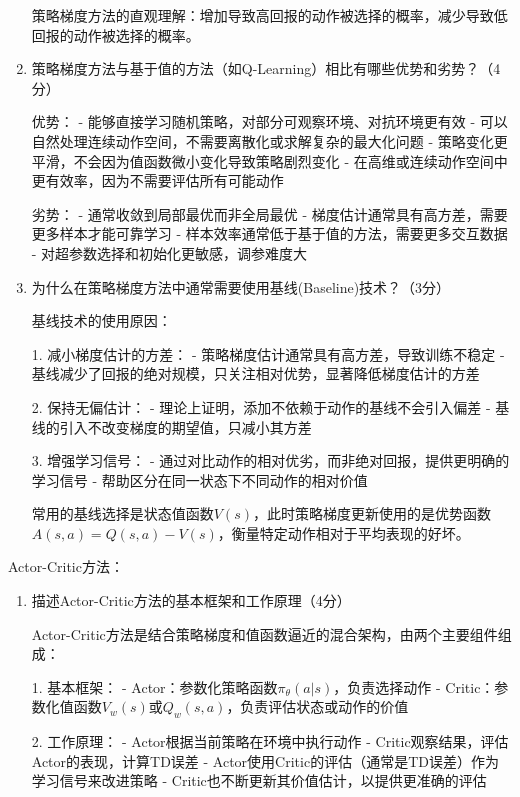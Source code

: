 \documentclass[zihao=5,answers]{BHCexam}
\begin{document}
\begin{questions}
\begin{solution}
\begin{enumerate}
    策略梯度方法的直观理解：增加导致高回报的动作被选择的概率，减少导致低回报的动作被选择的概率。
    
    \item 策略梯度方法与基于值的方法（如Q-Learning）相比有哪些优势和劣势？（4分）
    
    优势：
    - 能够直接学习随机策略，对部分可观察环境、对抗环境更有效
    - 可以自然处理连续动作空间，不需要离散化或求解复杂的最大化问题
    - 策略变化更平滑，不会因为值函数微小变化导致策略剧烈变化
    - 在高维或连续动作空间中更有效率，因为不需要评估所有可能动作
    
    劣势：
    - 通常收敛到局部最优而非全局最优
    - 梯度估计通常具有高方差，需要更多样本才能可靠学习
    - 样本效率通常低于基于值的方法，需要更多交互数据
    - 对超参数选择和初始化更敏感，调参难度大
    
    \item 为什么在策略梯度方法中通常需要使用基线(Baseline)技术？（3分）
    
    基线技术的使用原因：
    
    1. 减小梯度估计的方差：
       - 策略梯度估计通常具有高方差，导致训练不稳定
       - 基线减少了回报的绝对规模，只关注相对优势，显著降低梯度估计的方差
    
    2. 保持无偏估计：
       - 理论上证明，添加不依赖于动作的基线不会引入偏差
       - 基线的引入不改变梯度的期望值，只减小其方差
    
    3. 增强学习信号：
       - 通过对比动作的相对优劣，而非绝对回报，提供更明确的学习信号
       - 帮助区分在同一状态下不同动作的相对价值
    
    常用的基线选择是状态值函数$V(s)$，此时策略梯度更新使用的是优势函数$A(s,a) = Q(s,a) - V(s)$，衡量特定动作相对于平均表现的好坏。
\end{enumerate}
\end{solution}

\question[10] Actor-Critic方法：
\begin{solution}
\begin{enumerate}
    \item 描述Actor-Critic方法的基本框架和工作原理（4分）
    
    Actor-Critic方法是结合策略梯度和值函数逼近的混合架构，由两个主要组件组成：
    
    1. 基本框架：
       - Actor：参数化策略函数$\pi_\theta(a|s)$，负责选择动作
       - Critic：参数化值函数$V_w(s)$或$Q_w(s,a)$，负责评估状态或动作的价值
    
    2. 工作原理：
       - Actor根据当前策略在环境中执行动作
       - Critic观察结果，评估Actor的表现，计算TD误差
       - Actor使用Critic的评估（通常是TD误差）作为学习信号来改进策略
       - Critic也不断更新其价值估计，以提供更准确的评估
    

\end{enumerate}
\end{solution}
\end{questions}
\end{document}
